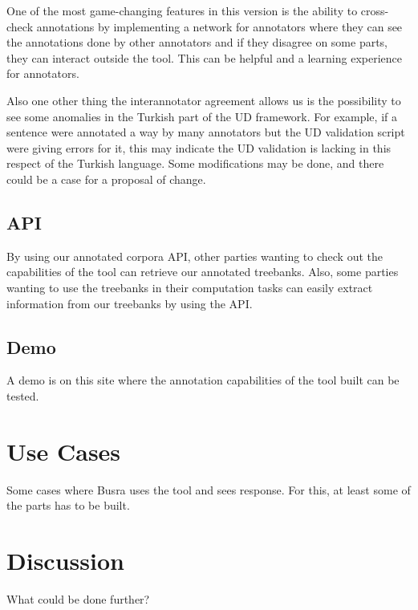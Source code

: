 \documentclass[
]{ceurart}
\begin{document}
One of the most game-changing features in this version is the ability to cross-check annotations by implementing a network for annotators where they can see the annotations done by other annotators and if they disagree on some parts, they can interact outside the tool.
This can be helpful and a learning experience for annotators.

Also one other thing the interannotator agreement allows us is the possibility to see some anomalies in the Turkish part of the UD framework.
For example, if a sentence were annotated a way by many annotators but the UD validation script were giving errors for it, this may indicate the UD validation is lacking in this respect of the Turkish language.
Some modifications may be done, and there could be a case for a proposal of change.

\subsection{API}

By using our annotated corpora API, other parties wanting to check out the capabilities of the tool can retrieve our annotated treebanks.
Also, some parties wanting to use the treebanks in their computation tasks can easily extract information from our treebanks by using the API.

\subsection{Demo}

A demo is on this site where the annotation capabilities of the tool built can be tested.

\section{Use Cases}

Some cases where Busra uses the tool and sees response.
For this, at least some of the parts has to be built.

\section{Discussion}

What could be done further?


\end{document}
